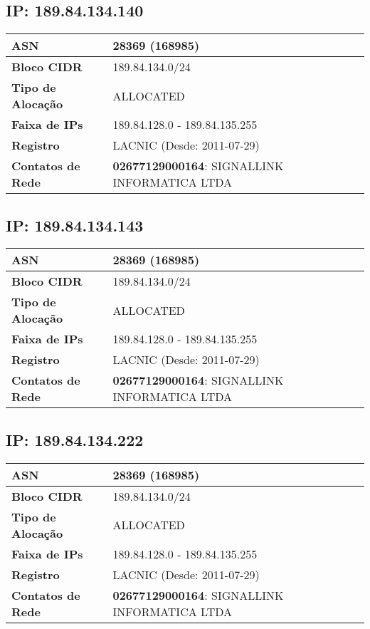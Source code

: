     \subsection{IP: 189.84.134.140}
    \begin{tabular}{|l|l|}
    \hline
    \textbf{ASN} & 28369 (168985) \\ \hline
    \textbf{Bloco CIDR} & 189.84.134.0/24 \\ \hline
    \textbf{Tipo de Alocação} & ALLOCATED \\ \hline
    \textbf{Faixa de IPs} & 189.84.128.0 - 189.84.135.255 \\ \hline
    \textbf{Registro} & LACNIC (Desde: 2011-07-29) \\ \hline
        
\textbf{Contatos de Rede} & \textbf{02677129000164}: SIGNALLINK INFORMATICA LTDA 
\\ \hline
\end{tabular}


    \subsection{IP: 189.84.134.143}
    \begin{tabular}{|l|l|}
    \hline
    \textbf{ASN} & 28369 (168985) \\ \hline
    \textbf{Bloco CIDR} & 189.84.134.0/24 \\ \hline
    \textbf{Tipo de Alocação} & ALLOCATED \\ \hline
    \textbf{Faixa de IPs} & 189.84.128.0 - 189.84.135.255 \\ \hline
    \textbf{Registro} & LACNIC (Desde: 2011-07-29) \\ \hline
        
\textbf{Contatos de Rede} & \textbf{02677129000164}: SIGNALLINK INFORMATICA LTDA 
\\ \hline
\end{tabular}


    \subsection{IP: 189.84.134.222}
    \begin{tabular}{|l|l|}
    \hline
    \textbf{ASN} & 28369 (168985) \\ \hline
    \textbf{Bloco CIDR} & 189.84.134.0/24 \\ \hline
    \textbf{Tipo de Alocação} & ALLOCATED \\ \hline
    \textbf{Faixa de IPs} & 189.84.128.0 - 189.84.135.255 \\ \hline
    \textbf{Registro} & LACNIC (Desde: 2011-07-29) \\ \hline
        
\textbf{Contatos de Rede} & \textbf{02677129000164}: SIGNALLINK INFORMATICA LTDA 
\\ \hline
\end{tabular}


